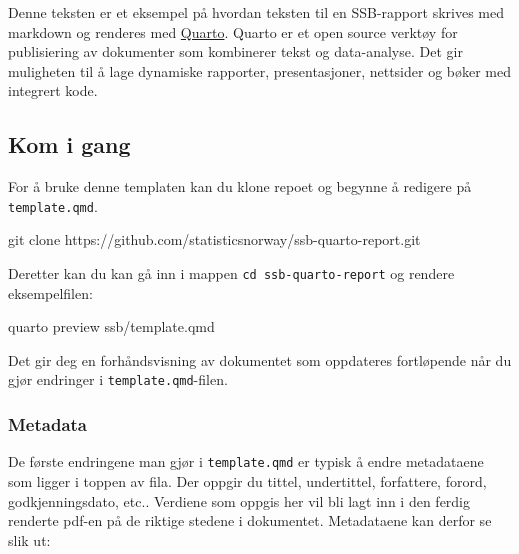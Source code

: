 \documentclass[
  10pt,
]{scrartcl}
\newenvironment{Shaded}{\begin{snugshade}}{\end{snugshade}}
\newcommand{\ExtensionTok}[1]{\textcolor[rgb]{0.00,0.23,0.31}{#1}}
\newcommand{\FunctionTok}[1]{\textcolor[rgb]{0.28,0.35,0.67}{#1}}
\newcommand{\NormalTok}[1]{\textcolor[rgb]{0.00,0.23,0.31}{#1}}
\begin{document}
Denne teksten er et eksempel på hvordan teksten til en SSB-rapport
skrives med markdown og renderes med \href{https://quarto.org/}{Quarto}.
Quarto er et open source verktøy for publisiering av dokumenter som
kombinerer tekst og data-analyse. Det gir muligheten til å lage
dynamiske rapporter, presentasjoner, nettsider og bøker med integrert
kode.

\subsection{Kom i gang}\label{kom-i-gang}

For å bruke denne templaten kan du klone repoet og begynne å redigere på
\texttt{template.qmd}.

\begin{Shaded}
\begin{Highlighting}[]
\FunctionTok{git}\NormalTok{ clone https://github.com/statisticsnorway/ssb{-}quarto{-}report.git}
\end{Highlighting}
\end{Shaded}

Deretter kan du kan gå inn i mappen \texttt{cd\ ssb-quarto-report} og
rendere eksempelfilen:

\begin{Shaded}
\begin{Highlighting}[]
\ExtensionTok{quarto}\NormalTok{ preview ssb/template.qmd}
\end{Highlighting}
\end{Shaded}

Det gir deg en forhåndsvisning av dokumentet som oppdateres fortløpende
når du gjør endringer i \texttt{template.qmd}-filen.

\subsubsection{Metadata}\label{metadata}

De første endringene man gjør i \texttt{template.qmd} er typisk å endre
metadataene som ligger i toppen av fila. Der oppgir du tittel,
undertittel, forfattere, forord, godkjenningsdato, etc.. Verdiene som
oppgis her vil bli lagt inn i den ferdig renderte pdf-en på de riktige
stedene i dokumentet. Metadataene kan derfor se slik ut:
\end{document}
